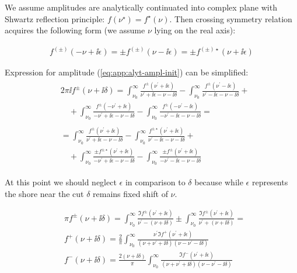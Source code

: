 We assume amplitudes are analytically continuated into complex plane with Shwartz reflection principle: $f(\nu^\star) = f^\star(\nu)$. Then crossing symmetry relation acquires the following form (we assume $\nu$ lying on the real axis):

\begin{align}
    f^{(\pm)}(-\nu+\ii \epsilon) = \pm f^{(\pm)}(\nu - \ii \epsilon) = \pm f^{(\pm)\star}(\nu + \ii \epsilon)
\end{align}

Expression for amplitude (\cref{eq:app:alyt-ampl-init}) can be simplified:
\begin{align}
    \begin{split}
        &2 \pi \ii f^{\pm}(\nu+\ii\delta) = \int_{\nu_0}^{\infty} \frac{f^{\pm}(\nu^\prime + \ii \epsilon)}{\nu^\prime + \ii \epsilon - \nu - \ii \delta} - \int_{\nu_0}^{\infty} \frac{f^{\pm}(\nu^\prime-\ii \epsilon)}{\nu^\prime - \ii \epsilon - \nu - \ii \delta} + \\
        &\quad + \int_{\nu_0}^{\infty} \frac{f^{\pm}(-\nu^\prime+\ii \epsilon)}{-\nu^\prime + \ii \epsilon - \nu - \ii \delta} - \int_{\nu_0}^{\infty} \frac{f^{\pm}(-\nu^\prime-\ii \epsilon)}{-\nu^\prime - \ii \epsilon - \nu - \ii \delta} =
    \end{split} \\
    \begin{split}
        &= \int_{\nu_0}^{\infty} \frac{f^{\pm}(\nu^\prime + \ii \epsilon)}{\nu^\prime + \ii \epsilon - \nu - \ii \delta} - \int_{\nu_0}^{\infty} \frac{f^{\pm \star}(\nu^\prime+\ii \epsilon)}{\nu^\prime - \ii \epsilon - \nu - \ii \delta} +  \\
        &\quad + \int_{\nu_0}^{\infty} \frac{\pm f^{\pm \star}(\nu^\prime+\ii \epsilon)}{-\nu^\prime + \ii \epsilon - \nu - \ii \delta} - \int_{\nu_0}^{\infty} \frac{\pm f^{\pm}(\nu^\prime+\ii \epsilon)}{-\nu^\prime - \ii \epsilon - \nu - \ii \delta}
    \end{split}
\end{align}

At this point we should neglect $\epsilon$ in comparison to $\delta$ because while $\epsilon$ represents the shore near the cut $\delta$ remains fixed shift of $\nu$.

\begin{align}
    &\pi f^{\pm}(\nu+\ii\delta) = \int_{\nu_0}^{\infty} \frac{\Im f^{\pm}(\nu^\prime + \ii \epsilon)}{\nu^\prime - (\nu+\ii \delta)} \pm \int_{\nu_0}^{\infty} \frac{\Im f^{\pm}(\nu^\prime+\ii \epsilon)}{\nu^\prime + (\nu+\ii\delta)} = \\
    &f^{+}(\nu+\ii \delta) = \frac{2}{\pi} \int_{\nu_0}^{\infty} \frac{\nu^\prime \Im f^{+}(\nu^\prime + \ii \epsilon)}{(\nu + \nu^\prime + \ii \delta)(\nu - \nu^\prime - \ii\delta)} \\
    &f^{-}(\nu+\ii \delta) = \frac{2 (\nu+\ii \delta)}{\pi} \int_{\nu_0}^{\infty} \frac{\Im f^{-}(\nu^\prime + \ii \epsilon)}{(\nu + \nu^\prime + \ii \delta)(\nu - \nu^\prime - \ii \delta)}
\end{align}

